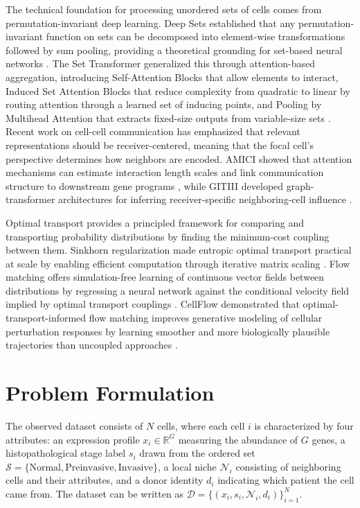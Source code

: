 \documentclass[conference]{IEEEtran}
\begin{document}
The technical foundation for processing unordered sets of cells comes from permutation-invariant deep learning. Deep Sets established that any permutation-invariant function on sets can be decomposed into element-wise transformations followed by sum pooling, providing a theoretical grounding for set-based neural networks \cite{Zaheer2017-gu}. The Set Transformer generalized this through attention-based aggregation, introducing Self-Attention Blocks that allow elements to interact, Induced Set Attention Blocks that reduce complexity from quadratic to linear by routing attention through a learned set of inducing points, and Pooling by Multihead Attention that extracts fixed-size outputs from variable-size sets \cite{Lee2018-ya}. Recent work on cell-cell communication has emphasized that relevant representations should be receiver-centered, meaning that the focal cell's perspective determines how neighbors are encoded. AMICI showed that attention mechanisms can estimate interaction length scales and link communication structure to downstream gene programs \cite{Hong2025-jm}, while GITIII developed graph-transformer architectures for inferring receiver-specific neighboring-cell influence \cite{Xiao2025-fy}.

Optimal transport provides a principled framework for comparing and transporting probability distributions by finding the minimum-cost coupling between them. Sinkhorn regularization made entropic optimal transport practical at scale by enabling efficient computation through iterative matrix scaling \cite{Cuturi2013-li}. Flow matching offers simulation-free learning of continuous vector fields between distributions by regressing a neural network against the conditional velocity field implied by optimal transport couplings \cite{Lipman2022-ns}. CellFlow demonstrated that optimal-transport-informed flow matching improves generative modeling of cellular perturbation responses by learning smoother and more biologically plausible trajectories than uncoupled approaches \cite{Klein2025-sr}.

\section{Problem Formulation}

The observed dataset consists of $N$ cells, where each cell $i$ is characterized by four attributes: an expression profile $x_i \in \mathbb{R}^G$ measuring the abundance of $G$ genes, a histopathological stage label $s_i$ drawn from the ordered set $\mathcal{S} = \{\text{Normal}, \text{Preinvasive}, \text{Invasive}\}$, a local niche $\mathcal{N}_i$ consisting of neighboring cells and their attributes, and a donor identity $d_i$ indicating which patient the cell came from. The dataset can be written as $\mathcal{D} = \{(x_i, s_i, \mathcal{N}_i, d_i)\}_{i=1}^{N}$.
\end{document}
